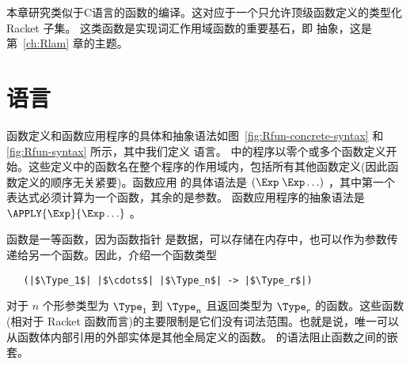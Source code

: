 \documentclass[11pt]{book}
\begin{document}
本章研究类似于C语言的函数的编译。这对应于一个只允许顶级函数定义的类型化 Racket 子集。 
这类函数是实现词汇作用域函数的重要基石，即  抽象，这是第~\ref{ch:Rlam} 章的主题。

\section{ \LangFun{} 语言}

函数定义和函数应用程序的具体和抽象语法如图~\ref{fig:Rfun-concrete-syntax} 和
\ref{fig:Rfun-syntax} 所示，其中我们定义 \LangFun{} 语言。
\LangFun{} 中的程序以零个或多个函数定义开始。这些定义中的函数名在整个程序的作用域内，包括所有其他函数定义(因此函数定义的顺序无关紧要)。函数应用 的具体语法是 $(\Exp \; \Exp \ldots)$
，其中第一个表达式必须计算为一个函数，其余的是参数。
函数应用程序的抽象语法是
$\APPLY{\Exp}{\Exp\ldots}$ 。


函数是一等函数，因为函数指针
是数据，可以存储在内存中，也可以作为参数传递给另一个函数。因此，介绍一个函数类型
\begin{lstlisting}
   (|$\Type_1$| |$\cdots$| |$\Type_n$| -> |$\Type_r$|)
\end{lstlisting}
对于 $n$ 个形参类型为 $\Type_1$ 到
$\Type_n$ 且返回类型为 $\Type_r$ 的函数。这些函数(相对于 Racket 函数而言)的主要限制是它们没有词法范围。也就是说，唯一可以从函数体内部引用的外部实体是其他全局定义的函数。 \LangFun{} 的语法阻止函数之间的嵌套。
\end{document}
